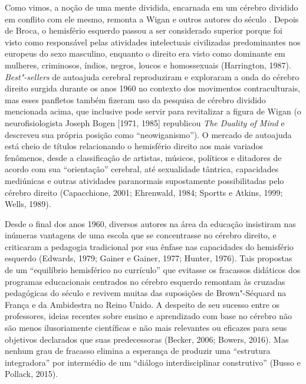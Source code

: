 Como vimos, a noção de uma mente dividida, encarnada em um cérebro
dividido em conflito com ele mesmo, remonta a Wigan e outros autores do
século . Depois de Broca, o hemisfério esquerdo passou a ser
considerado superior porque foi visto como responsável pelas
atividades intelectuais civilizadas predominantes nos europeus do sexo
masculino, enquanto o direito era visto como dominante em mulheres,
criminosos, índios, negros, loucos e homossexuais (Harrington, 1987).
\emph{Best"-sellers} de autoajuda cerebral reproduziram e exploraram a
onda do cérebro direito surgida durante os anos 1960 no contexto dos
movimentos contraculturais, mas esses panfletos também fizeram uso da
pesquisa de cérebro dividido mencionada acima, que inclusive pode servir
para revitalizar a figura de Wigan (o neurofisiologista Joseph Bogen
{[}1971, 1985{]} republicou \emph{The Duality of Mind} e descreveu sua
própria posição como ``neowiganismo''). O mercado de autoajuda está
cheio de títulos relacionando o hemisfério direito aos mais variados
fenômenos, desde a classificação de artistas, músicos, políticos e
ditadores de acordo com sua ``orientação'' cerebral, até sexualidade
tântrica, capacidades mediúnicas e outras atividades paranormais
supostamente possibilitadas pelo cérebro direito (Capacchione, 2001;
Ehrenwald, 1984; Sportts e Atkins, 1999; Wells, 1989).

Desde o final dos anos 1960, diversos autores na área da educação
insistiram nas inúmeras vantagens de uma escola que se concentrasse no
cérebro direito, e criticaram a pedagogia tradicional por sua ênfase nas
capacidades do hemisfério esquerdo (Edwards, 1979; Gainer e Gainer,
1977; Hunter, 1976). Tais propostas de um ``equilíbrio hemisférico no
currículo'' que evitasse os fracassos didáticos dos programas
educacionais centrados no cérebro esquerdo remontam às cruzadas pedagógicas do
século  e revivem muitas das suposições de Brown"-Séquard na França e
da Ambidestra no Reino Unido. A despeito de seu sucesso
entre os professores, ideias recentes sobre ensino e aprendizado
com base no cérebro não são menos ilusoriamente científicas e não mais
relevantes ou eficazes para seus objetivos declarados que suas
predecessoras (Becker, 2006; Bowers, 2016). Mas nenhum grau de fracasso
elimina a esperança de produzir uma ``estrutura integradora'' por
intermédio de um ``diálogo interdisciplinar construtivo'' (Busso e
Pollack, 2015).

